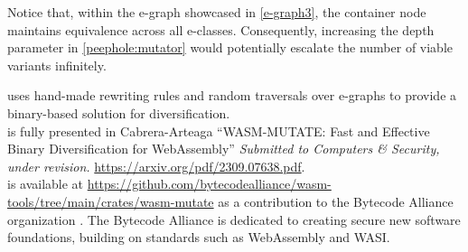 Notice that, within the e-graph showcased in \autoref{e-graph3}, the container node maintains equivalence across all e-classes. 
Consequently, increasing the depth parameter in \autoref{peephole:mutator} would potentially escalate the number of viable variants infinitely.




\begin{tcolorbox}[title=Contribution paper and artifact,boxrule=1pt,arc=.2em,boxsep=0.5mm]
  \tool uses hand-made rewriting rules and random traversals over e-graphs to provide a binary-based solution for \Wasm diversification. \\
  \tool is fully presented in Cabrera-Arteaga \etal ``WASM-MUTATE: Fast and Effective Binary Diversification for WebAssembly''
  \emph{Submitted to Computers \& Security, under revision. }
 \url{https://arxiv.org/pdf/2309.07638.pdf}.
  \\
  \tool is available at \url{https://github.com/bytecodealliance/wasm-tools/tree/main/crates/wasm-mutate} as a contribution to the Bytecode Alliance organization . The Bytecode Alliance is dedicated to creating secure new software foundations, building on standards such as WebAssembly and WASI.
\end{tcolorbox}